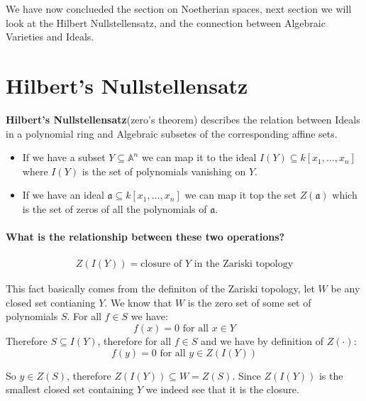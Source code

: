 We have now conclueded the section on Noetherian spaces, next section we will look at the Hilbert Nullstellensatz, and the connection between Algebraic Varieties and Ideals.


\section{Hilbert's Nullstellensatz}
\begin{definition}
    \textbf{Hilbert's Nullstellensatz}(zero's theorem) describes the relation between Ideals in a polynomial ring and Algebraic subsetes of the corresponding affine sets.

    \begin{itemize}
        \item If we have a subset $Y\subseteq \mathbb{A}^n$ we can map it to the ideal $I(Y)\subseteq k[x_1,\dots,x_n]$ where $I(Y)$ is the set of polynomials vanishing on $Y$.
        \item If we have an ideal $\mathfrak{a}\subseteq k[x_1,\dots,x_n]$ we can map it top the set $Z(\mathfrak{a})$ which is the set of zeros of all the polynomials of $\mathfrak{a}$.
    \end{itemize}
\end{definition}
\paragraph*{What is the relationship between these two operations?}
\begin{align*}
    Z(I(Y)) = \text{closure of }Y \text{ in the Zariski topology}
\end{align*}

This fact basically comes from the definiton of the Zariski topology, let $W$ be any closed set contianing $Y$. We know that $W$ is the zero set of some set of polynomials $S$. For all $f\in S$ we have:\begin{equation*}
    f(x) = 0\text{ for all }x\in Y
\end{equation*}
Therefore $S\subseteq I(Y)$, therefore for all $f\in S$ and we have by definition of $Z(\cdot)$:\begin{equation*}
    f(y) = 0 \text{ for all }y\in Z(I(Y))
\end{equation*}

So $y\in Z(S)$, therefore $Z(I(Y))\subseteq W = Z(S)$. Since $Z(I(Y))$ is the smallest closed set containing $Y$ we indeed see that it is the closure.

\

